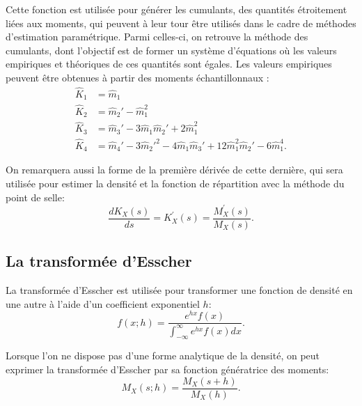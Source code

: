 Cette fonction est utilisée pour générer les cumulants, des quantités
étroitement liées aux moments, qui peuvent à leur tour être utilisés
dans le cadre de méthodes d'estimation paramétrique. Parmi celles-ci,
on retrouve la méthode des cumulants, dont l'objectif est de former un
système d'équations où les valeurs empiriques et théoriques de ces
quantités sont égales. Les valeurs empiriques peuvent être obtenues à
partir des moments échantillonnaux \citep{stuart1987kendall}:
\begin{subequations}\label{eq:cumulantsempiriques}
  \begin{align}
    \hat{K}_1 &= \hat{m}_1 \label{eq:cumulantsempiriques1}\\
    \hat{K}_2 &= \hat{m}_2' - \hat{m}_1^2 \label{eq:cumulantsempiriques2}\\
    \hat{K}_3 &= \hat{m}_3' - 3\hat{m}_1\hat{m}_2' + 2\hat{m}_1^2 \label{eq:cumulantsempiriques3}\\
    \hat{K}_4 &= \hat{m}_4' - 3\hat{m}_2'^2 - 4\hat{m}_1\hat{m}_3' + 12\hat{m}_1^2\hat{m}_2' -
    6\hat{m}_1^4 \label{eq:cumulantsempiriques4}.
  \end{align}
\end{subequations}

On remarquera aussi la forme de la première dérivée de cette dernière,
qui sera utilisée pour estimer la densité et la fonction de
répartition avec la méthode du point de selle:
\begin{equation}
  \label{eq:derivfgc}
  \frac{dK_X(s)}{ds} = K^{\prime}_X(s) = \frac{M^{\prime}_X(s)}{M_X(s)}.
\end{equation}

\subsection{La transformée d'Esscher}
\label{sec:transesscher}

La transformée d'Esscher est utilisée pour transformer une fonction de
densité en une autre à l'aide d'un coefficient exponentiel $h$:
\begin{equation}
  \label{eq:esschertransform}
  f(x;h)=\frac{e^{hx}f(x)}{\int_{-\infty}^\infty e^{hx} f(x) dx}.
\end{equation}

Lorsque l'on ne dispose pas d'une forme analytique de la densité, on
peut exprimer la transformée d'Esscher par sa fonction génératrice des
moments:
\begin{equation}
  \label{eq:esscherMx}
  M_X(s;h) = \frac{M_X(s+h)}{M_X(h)}.
\end{equation}

